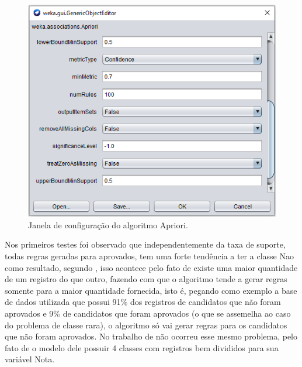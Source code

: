 \par
\begin{figure}[!htp]
	\begin{center}
    \caption{\label{fig:waveform_fig} Janela de configuração do algoritmo Apriori.}
	\includegraphics[scale=0.70]{Figuras/Janela_configuracao_apriori.png}
	\end{center}
\end{figure}


\par
Nos primeiros testes foi observado que independentemente da taxa de suporte, todas regras geradas para aprovados, tem uma forte tendência a ter a classe Nao como resultado, segundo , isso acontece pelo fato de existe uma maior quantidade de um registro do que outro, fazendo com que o algoritmo tende a gerar regras somente para a maior quantidade fornecida, isto é, pegando como exemplo a base de dados utilizada que possui  91\% dos registros de candidatos que não foram aprovados e 9\% de candidatos que foram aprovados (o que se assemelha ao caso do problema de classe rara), o algoritmo só vai gerar regras para os candidatos que não foram aprovados. No trabalho de  não ocorreu esse mesmo problema, pelo fato de o modelo dele possuir 4 classes com registros bem divididos para sua variável Nota.


